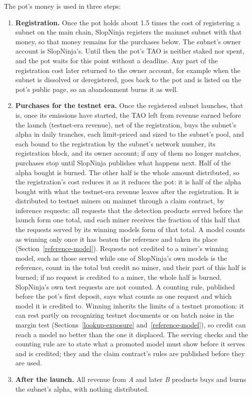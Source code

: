The pot's money is used in three steps:
\begin{enumerate}\tightlist
\item \textbf{Registration.} Once the pot holds about 1.5 times the cost of
registering a subnet on the main chain, SlopNinja registers the mainnet subnet
with that money, so that money remains for the purchases below. The subnet's
owner account is SlopNinja's. Until then the pot's TAO is neither staked nor
spent, and the pot waits for this point without a deadline. Any part of the
registration cost later returned to the owner account, for example when the
subnet is dissolved or deregistered, goes back to the pot and is listed on the
pot's public page, so an abandonment burns it as well.
\item \textbf{Purchases for the testnet era.} Once the registered subnet
launches, that is, once its emissions have started, the TAO left from revenue
earned before the launch (testnet-era revenue), net of the registration, buys
the subnet's alpha in daily tranches, each limit-priced and sized to the
subnet's pool, and each bound to the registration by the subnet's network number, its registration
block, and its owner account; if any of them no longer matches, purchases stop
until SlopNinja publishes what happens next. Half of the alpha bought is
burned. The other half is the whole amount distributed, so the registration's
cost reduces it as it reduces the pot: it is half of the alpha bought with what
the testnet-era revenue leaves after the registration. It is distributed to
testnet miners on mainnet through a claim contract, by inference requests: all
requests that the detection products served before the launch form one total, and each miner receives the
fraction of this half that the requests served by its winning models form of
that total. A model counts as winning only once it has beaten the reference
and taken its place (Section~\ref{reference-model}). Requests not credited to
a miner's winning model, such as those served while one of SlopNinja's own
models is the reference, count in the total but credit no miner, and their
part of this half is burned; if no request is credited to a miner, the whole
half is burned. SlopNinja's own test requests are not counted. A counting
rule, published before the pot's first deposit, says what counts as one
request and which model it is credited to. Winning inherits the limits of a
testnet promotion: it can rest partly on recognizing testnet documents or on
batch noise in the margin test (Sections~\ref{lookup-exposure}
and~\ref{reference-model}), so credit can reach a model no better than the one
it displaced. The serving
checks and the counting rule are to state what a promoted model must show
before it serves and is credited; they and the claim contract's rules are
published before they are used.
\item \textbf{After the launch.} All revenue from \textit{A} and later
\textit{B} products buys and burns the subnet's alpha, with nothing
distributed.
\end{enumerate}
